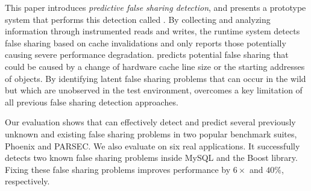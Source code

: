 \label{sec:conclusion}
This paper introduces \emph{predictive false sharing detection}, and presents a prototype system that performs this detection called \Predator{}. By collecting and analyzing information through instrumented reads and writes, the runtime system detects false sharing based on cache invalidations and only reports those potentially causing severe performance degradation.
\Predator{} predicts potential false sharing that could be caused by a change of hardware cache line size or the starting addresses of objects. By identifying latent false sharing problems that can occur in the wild but which are unobserved in the test environment, \Predator{} overcomes a key limitation of
all previous false sharing detection approaches.

Our evaluation shows that \Predator{} can effectively detect and predict several previously unknown and existing false sharing problems in two popular benchmark suites, Phoenix and PARSEC. We also evaluate \Predator{} on six real applications. 
It successfully detects two known false sharing problems inside MySQL and the Boost library.
Fixing these false sharing problems improves performance by $6\times$ and $40\%$, respectively.

